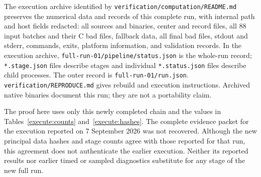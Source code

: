 The execution archive identified by
\texttt{verification/\allowbreak computation/README.md} preserves the numerical data and records
of this complete run, with internal path and host fields redacted: all sources
and binaries, center and record files, all 88 input batches and their C
bad files, fallback data, all final bad files, stdout and stderr,
commands, exits, platform information, and validation records. In the
execution archive, \texttt{full-run-01/pipeline/status.json} is the
whole-run record; \texttt{*.stage.json} files describe stages and
individual \texttt{*.status.json} files describe child processes.
The outer record is \texttt{full-run-01/run.json}.
\texttt{verification/REPRODUCE.md} gives rebuild and
execution instructions. Archived native binaries document this run;
they are not a portability claim.

The proof here uses only this newly completed chain and the values in
Tables~\ref{execute:counts} and~\ref{execute:hashes}. The complete
evidence packet for the execution reported on 7 September 2026 was not
recovered. Although the new principal data hashes and stage counts agree
with those reported for that run, this agreement does not authenticate
the earlier execution. Neither its reported results nor earlier timed
or sampled diagnostics substitute for any stage of the new full run.
